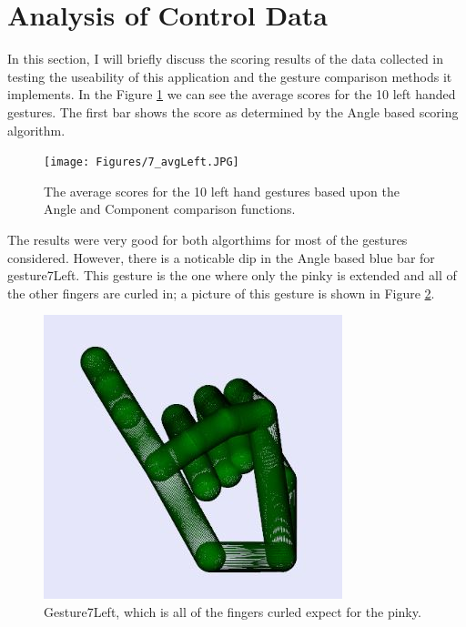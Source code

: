 \section{Analysis of Control Data }
In this section, I will briefly discuss the scoring results of the data collected in testing the useability of this application and the gesture comparison methods it implements. In the Figure \ref{fig:leftAvgs} we can see the average scores for the 10 left handed gestures. The first bar shows the score as determined by the Angle based scoring algorithm. 
\begin{figure}[H]
\centering
\texttt{[image: Figures/7\_avgLeft.JPG]}
\caption[Averages for Left Hand Gestures]{The average scores for the 10 left hand gestures based upon the Angle and Component comparison functions.}
\label{fig:leftAvgs}
\end{figure}
The results were very good for both algorthims for most of the gestures considered. However, there is a noticable dip in the Angle based blue bar for gesture7Left. This gesture is the one where only the pinky is extended and all of the other fingers are curled in; a picture of this gesture is shown in Figure \ref{fig:gesture7Leftagain}.
\begin{figure}[H]
\centering
\includegraphics[scale=0.75]{Figures/gesture7Left.JPG}
\caption[Gesture7Left]{Gesture7Left, which is all of the fingers curled expect for the pinky.}
\label{fig:gesture7Leftagain}
\end{figure}
